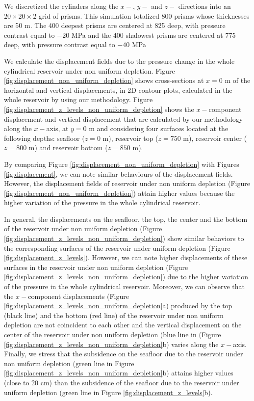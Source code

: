 \documentclass[journal abbreviation, manuscript]{copernicus}
\begin{document}
We  discretized the cylinders  along the $x-$, $y-$ and $z-$ directions into an $20 \times 20 \times 2$ grid of prisms.
This simulation totalized 800 prisms whose thicknesses are 50 m.
The 400 deepest prisms are centered at 825 deep, with pressure contrast equal to $-20$ MPa and the 400 shalowest prisms are centered at 775 deep, with pressure contrast equal to $-40$ MPa  

We calculate the displacement fields due to the pressure change in the whole cylindrical reservoir under non uniform depletion.
Figure \ref{fig:displacement_non_uniform_depletion} shows cross-sections at $x  = 0$ m of the horizontal and vertical displacements, in 2D contour plots, calculated in the whole reservoir by using our methodology.
Figure \ref{fig:displacement_z_levels_non_uniform_depletion} shows the $x-$component displacement and vertical displacement that are calculated by our methodology along the 
$x-$axis, at $y = 0$ m and considering four surfaces located at the following depths:  seafloor ($z = 0$ m), reservoir top ($z = 750$ m), reservoir center ($z = 800$ m) and reservoir bottom ($z = 850$ m).

By comparing Figure \ref{fig:displacement_non_uniform_depletion} with Figures \ref{fig:displacement}, we can note similar behaviours of the displacement fields.
However,  the displacement fields of reservoir under non uniform depletion (Figure \ref{fig:displacement_non_uniform_depletion}) attain higher values because the higher variation of the pressure in the whole cylindrical reservoir.

In general, the displacements on the seafloor, the top, the center and the bottom of the reservoir under non uniform depletion 
(Figure \ref{fig:displacement_z_levels_non_uniform_depletion}) show similar behaviors to the corresponding surfaces of the reservoir under uniform depletion 
(Figure \ref{fig:displacement_z_levels}).
However, we can note higher displacements of  these surfaces in the reservoir under non uniform depletion (Figure \ref{fig:displacement_z_levels_non_uniform_depletion}) due to the higher variation of the pressure in the whole cylindrical reservoir.
Moreover, we can observe that the $x-$component displacements
(Figure \ref{fig:displacement_z_levels_non_uniform_depletion}a)
produced by the top (black line) and the bottom (red line) of the reservoir under non uniform depletion are not coincident to each other and the vertical displacement on the center of the reservoir under non uniform depletion (blue line in (Figure \ref{fig:displacement_z_levels_non_uniform_depletion}b) varies along the $x-$axis.
Finally, we stress that the subsidence on the seafloor due to the reservoir under non uniform depletion 
(green line in Figure  \ref{fig:displacement_z_levels_non_uniform_depletion}b) attains higher values (close to 20 cm) than the subsidence of the seafloor due to the reservoir under uniform depletion (green line in Figure  \ref{fig:displacement_z_levels}b).
\end{document}
